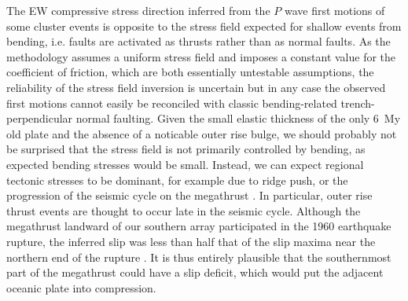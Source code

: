 \documentclass[reviewcopy]{elsarticle}
\begin{document}
The EW compressive stress direction inferred from the $P$ wave first
motions of some cluster events is opposite to the stress field
expected for shallow events from bending, i.e. faults are activated as thrusts
rather than as normal faults.   As the methodology \citep{robinson00} assumes a uniform stress field and imposes a
constant value for the coefficient of friction, which are both
essentially untestable assumptions, the reliability of the stress
field inversion is uncertain but in any case the observed
first motions cannot easily be reconciled with classic bending-related trench-perpendicular normal
faulting.  Given the small elastic thickness of the only 6~My old
plate and the absence of a noticable outer rise bulge, we should
probably not be surprised that the stress field is not primarily
controlled by bending, as expected bending stresses would be small.
Instead, we can expect regional tectonic stresses to be dominant, for
example due to ridge push, or the progression of the seismic cycle on
the megathrust \citep{christensen88}.  In particular, outer rise thrust
events are thought to occur late in the seismic cycle.  Although the
megathrust landward of our southern array participated in the 1960
earthquake rupture, the inferred slip was less than half that of the slip
maxima near the northern end of the rupture \citep[also see Figure~\ref{fig:overview-map}]{barrientos90}.  It is thus entirely
plausible that the southernmost part of the megathrust could have a slip
deficit, which would put the adjacent oceanic plate into compression.
\end{document}
